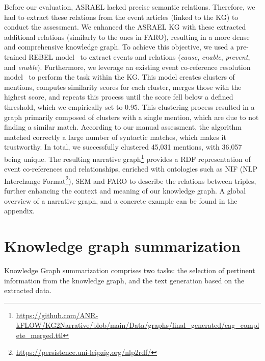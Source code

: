 \documentclass[
]{ceurart}
\begin{document}
Before our evaluation, ASRAEL lacked precise semantic relations. Therefore, we had to extract these relations from the event articles (linked to the KG) to conduct the assessment. We enhanced the ASRAEL KG with these extracted additional relations (similarly to the ones in FARO), resulting in a more dense and comprehensive knowledge graph. To achieve this objective, we used a pre-trained REBEL model~\cite{REBEL} to extract events and relations (\textit{cause}, \textit{enable}, \textit{prevent}, and \textit{enable}). Furthermore, we leverage an existing event co-reference resolution model~\cite{barhom-etal-2019-revisiting} to perform the task within the KG. This model creates clusters of mentions, computes similarity scores for each cluster, merges those with the highest score, and repeats this process until the score fell below a defined threshold, which we empirically set to 0.95. This clustering process resulted in a graph primarily composed of clusters with a single mention, which are due to not finding a similar match. According to our manual assessment, the algorithm matched correctly a large number of syntactic matches, which makes it trustworthy. In total, we successfully clustered 45,031 mentions, with 36,057 being unique. The resulting narrative graph\footnote{
	\url{https://github.com/ANR-kFLOW/KG2Narrative/blob/main/Data/graphs/final_generated/eag_complete_merged.ttl}
} provides a RDF representation of event co-references and relationships, enriched with ontologies such as NIF (NLP Interchange Format\footnote{\url{https://persistence.uni-leipzig.org/nlp2rdf/}}), SEM and FARO to describe the relations between triples, further enhancing the context and meaning of our knowledge graph. A global overview of a narrative graph, and a concrete example can be found in the appendix.

\section{Knowledge graph summarization}
\label{sec:KGS}
Knowledge Graph summarization comprises two tasks: the selection of pertinent information from the knowledge graph, and the text generation based on the extracted data.
\end{document}

